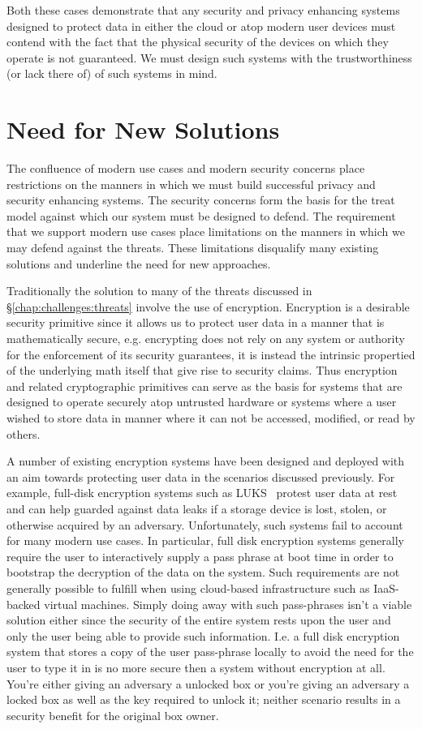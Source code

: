 Both these cases demonstrate that any security and privacy enhancing
systems designed to protect data in either the cloud or atop modern
user devices must contend with the fact that the physical security of
the devices on which they operate is not guaranteed. We must design
such systems with the trustworthiness (or lack there of) of such
systems in mind.

\section{Need for New Solutions}
\label{chap:challenges:solutions}

The confluence of modern use cases and modern security concerns place
restrictions on the manners in which we must build successful privacy
and security enhancing systems. The security concerns form the basis
for the treat model against which our system must be designed to
defend. The requirement that we support modern use cases place
limitations on the manners in which we may defend against the
threats. These limitations disqualify many existing solutions and
underline the need for new approaches.

Traditionally the solution to many of the threats discussed in
\S\ref{chap:challenges:threats} involve the use of
encryption. Encryption is a desirable security primitive since it
allows us to protect user data in a manner that is mathematically
secure, e.g. encrypting does not rely on any system or authority for
the enforcement of its security guarantees, it is instead the
intrinsic propertied of the underlying math itself that give rise to
security claims. Thus encryption and related cryptographic primitives
can serve as the basis for systems that are designed to operate
securely atop untrusted hardware or systems where a user wished to
store data in manner where it can not be accessed, modified, or read
by others.

A number of existing encryption systems have been designed and
deployed with an aim towards protecting user data in the scenarios
discussed previously. For example, full-disk encryption systems such
as LUKS~\cite{luks} protest user data at rest and can help guarded
against data leaks if a storage device is lost, stolen, or otherwise
acquired by an adversary. Unfortunately, such systems fail to account
for many modern use cases. In particular, full disk encryption systems
generally require the user to interactively supply a pass phrase at
boot time in order to bootstrap the decryption of the data on the
system. Such requirements are not generally possible to fulfill when
using cloud-based infrastructure such as IaaS-backed virtual
machines. Simply doing away with such pass-phrases isn't a viable
solution either since the security of the entire system rests upon the
user and only the user being able to provide such information. I.e. a
full disk encryption system that stores a copy of the user pass-phrase
locally to avoid the need for the user to type it in is no more secure
then a system without encryption at all. You're either giving an
adversary a unlocked box or you're giving an adversary a locked box as
well as the key required to unlock it; neither scenario results in a
security benefit for the original box owner.

